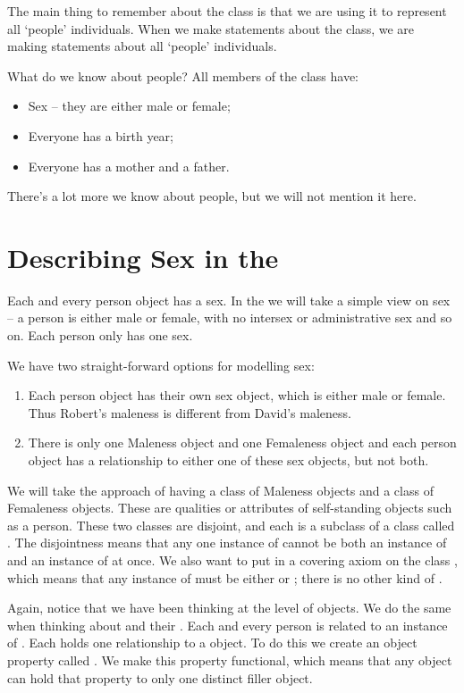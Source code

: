 The main thing to remember about the  class is that we are using it to represent all `people' individuals. When we make statements about the  class, we are making statements about all `people' individuals.

What do we know about people? All members of the  class have:
\begin{itemize}
\item Sex -- they are either male or female;
\item Everyone has a birth year;
\item Everyone has a mother and a father.
\end{itemize}
There's a lot more we know about people, but we will not mention it here.


\section{Describing Sex in the \fhkb}
\label{sec:sex}

Each and every person object has a sex. In the \fhkb we will take a simple view on sex -- a person is either male or female, with no intersex or administrative sex and so on. Each person only has one sex.

We have two straight-forward options for modelling sex:
\begin{enumerate}
\item Each person object has their own sex object, which is either male or female. Thus Robert's maleness is different from David's maleness.
\item There is only one Maleness object and one Femaleness object and each person object has a relationship to either one of these sex objects, but not both.
\end{enumerate}
\noindent We will take the approach of having a class of Maleness objects and a class of Femaleness objects. These are qualities or attributes of self-standing objects such as a person. These two classes are disjoint, and each is a subclass of a class called . The disjointness means that any one instance of  cannot be both an instance of  and an instance of  at once. We also want to put in a covering axiom on the class , which means that any instance of  must be either  or ; there is no other kind of .\herebedragons 

Again, notice that we have been thinking at the level of objects. We do the same when thinking about \person and their \sex. Each and every person is related to an instance of . Each \person holds one relationship to a  object. To do this we create an object property called . We make this property functional, which means that any object can hold that property to only one distinct filler object. 

